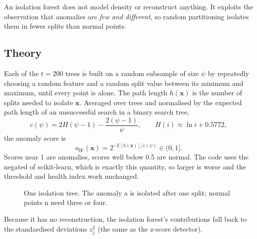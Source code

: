 An isolation forest does not model density or reconstruct anything. It exploits
the observation that anomalies are \emph{few and different}, so random
partitioning isolates them in fewer splits than normal points.

\subsection{Theory}
Each of the $t = 200$ trees is built on a random subsample of size $\psi$ by
repeatedly choosing a random feature and a random split value between its
minimum and maximum, until every point is alone. The path length $h(\bm x)$
is the number of splits needed to isolate $\bm x$. Averaged over trees and
normalised by the expected path length of an unsuccessful search in a binary
search tree,
\begin{equation}
  c(\psi) = 2H(\psi-1) - \frac{2(\psi-1)}{\psi}, \qquad
  H(i) \approx \ln i + 0.5772,
\end{equation}
the anomaly score is
\begin{equation}
  a_\text{IF}(\bm x) = 2^{-\mathbb E[h(\bm x)] / c(\psi)} \in (0, 1] .
\end{equation}
Scores near 1 are anomalies, scores well below 0.5 are normal. The code uses
the negated  of scikit-learn, which is exactly this
quantity, so larger is worse and the threshold and health index work
unchanged.

\begin{figure}[htbp]
\centering
{}
\caption{One isolation tree. The anomaly \textsf{a} is isolated after one
split; normal points \textsf{n} need three or four.}
\label{fig:iforest}
\end{figure}

Because it has no reconstruction, the isolation forest's contributions fall
back to the standardised deviations $z_j^2$ (the same as the z-score
detector).

